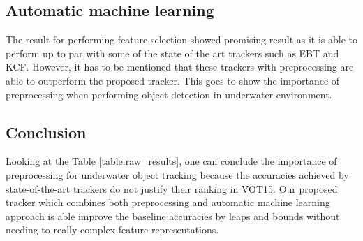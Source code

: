\documentclass[fypca]{socreport}
\begin{document}
\subsection{Automatic machine learning}

The result for performing feature selection showed promising result as it is
able to perform up to par with some of the state of the art trackers such as EBT
and KCF. However, it has to be mentioned that these trackers with preprocessing
are able to outperform the proposed tracker. This goes to show the importance of
preprocessing when performing object detection in underwater environment.

\subsection{Conclusion}

Looking at the Table \ref{table:raw_results}, one can conclude the importance of
preprocessing for underwater object tracking because the accuracies achieved by
state-of-the-art trackers do not justify their ranking in VOT15. Our proposed
tracker which combines both preprocessing and automatic machine learning
approach is able improve the baseline accuracies by leaps and bounds without
needing to really complex feature representations.


{}

\end{document}
